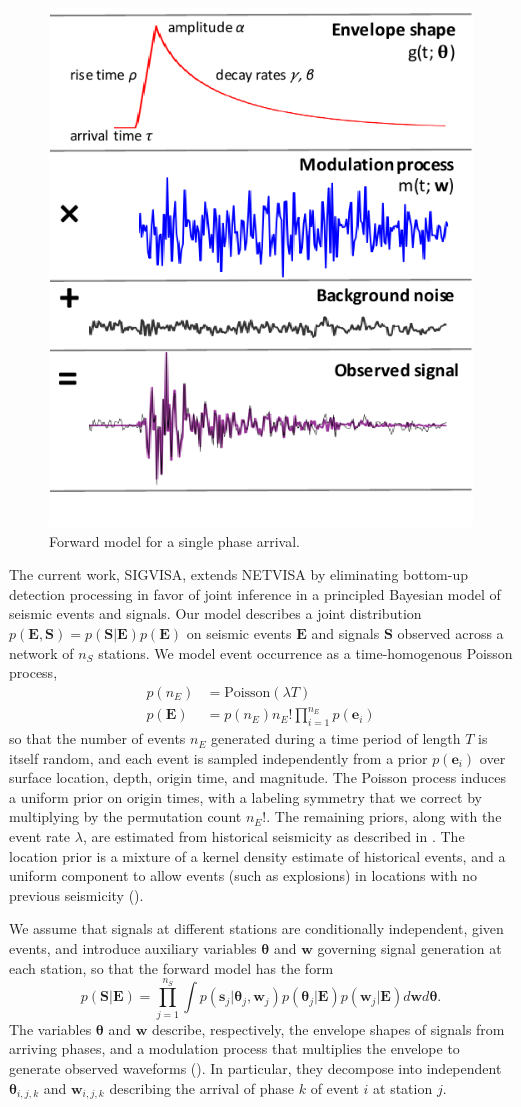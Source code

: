 \documentclass[twoside]{article} \usepackage{aistats2017}
\renewcommand{\v}[1]{\mathbf{#1}}
\begin{document}
\begin{figure}
\centering
\includegraphics[width=.40\textwidth]{model_algebra_cropped}
\caption{Forward model for a single phase arrival.}
\label{fig:model_algebra}
\end{figure}

The current work, SIGVISA, extends NETVISA by eliminating bottom-up
detection processing in favor of joint inference in a principled
Bayesian model of seismic events and signals. Our model describes a joint distribution
$p(\v{E}, \v{S}) = p(\v{S}|\v{E})p(\v{E})$ on seismic events $\v{E}$ and 
signals $\v{S}$ observed across a network of $n_S$ stations. We model event occurrence as a time-homogenous Poisson process,
\begin{align*}
p(n_E) &= \text{Poisson}(\lambda T)\\
p(\v{E}) &= p(n_E) n_E! \prod_{i=1}^{n_E} p(\v{e}_i)
\end{align*}
so that the number of events $n_E$ generated during a time period of
length $T$ is itself random, and each event is sampled independently from
a prior $p(\v{e}_i)$ over surface location, depth, origin time, and
magnitude. The Poisson process induces a uniform prior on origin
times, with a labeling symmetry that we correct by multiplying by the
permutation count $n_E!$. The remaining priors, along with the event
rate $\lambda$, are estimated from historical seismicity as described in \citep{arora2013net}. The location prior is a mixture of a kernel density
estimate of historical events, and a uniform component to allow events
(such as explosions) in locations with no previous seismicity ().

We assume that signals at different stations are
conditionally independent, given events, and introduce auxiliary
variables $\v{\theta}$ and $\v{w}$ governing signal generation at each
station, so that the forward model has the form
\begin{equation}
p(\v{S}|\v{E}) = \prod_{j=1}^{n_S} \int p(\v{s}_j | \v{\theta}_j, \v{w}_j)p(\v{\theta}_j|\v{E}) p(\v{w}_j| \v{E}) d\v{w} d\v{\theta}.
\end{equation}
The variables $\v{\theta}$ and $\v{w}$ describe, respectively, the
envelope shapes of signals from arriving phases, and a modulation process
that multiplies the envelope to generate observed waveforms (). In
particular, they decompose into independent $\v{\theta}_{i,j,k}$ and
$\v{w}_{i,j,k}$ describing the arrival of phase $k$ of event $i$ at
station $j$. 
\end{document}
